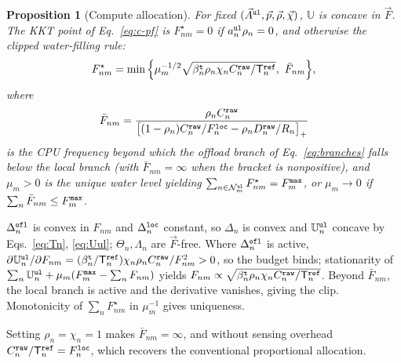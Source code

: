 \documentclass[journal]{IEEEtran}
\newtheorem{proposition}{Proposition}
\begin{document}
\begin{proposition}[Compute allocation]\label{prop:F}
For fixed $(\vec{A}^{\tt ul},\vec{p},\vec{\rho},\vec{\chi})$, $\mathbb{U}$ is concave in $\vec{F}$. The KKT point of Eq.~\eqref{eq:c-pf} is $F_{nm}^\star=0$ if $a_n^{\tt ul}\rho_n=0$, and otherwise the clipped water-filling rule:
\begin{equation}
F_{nm}^\star
=\min\Big\{\mu_m^{-1/2}\sqrt{\beta_n^{\tt t}\rho_n\chi_n C_n^{\tt raw}/\mathsf{T}_n^{\tt ref}},\ \bar F_{nm}\Big\},
\label{eq:Fstar}
\end{equation}
where
\begin{equation}
\bar F_{nm}
=\frac{\rho_n C_n^{\tt raw}}
{\big[(1-\rho_n)C_n^{\tt raw}/F_n^{\tt loc}-\rho_n D_n^{\tt raw}/R_n\big]_+}
\label{eq:Fbar}
\end{equation}
is the {CPU frequency} beyond which the offload branch of Eq.~\eqref{eq:branches} falls below the local branch (with $\bar F_{nm}=\infty$ when the bracket is nonpositive), and $\mu_m>0$ is the unique water level yielding $\sum_{n\in\mathcal{N}_m^{\tt ul}}F_{nm}^\star=F_m^{\tt max}$, or $\mu_m\to0$ if $\sum_n\bar F_{nm}\le F_m^{\tt max}$.
\end{proposition}
\begin{IEEEproof}
$\Delta_n^{\tt ofl}$ is convex in $F_{nm}$ and $\Delta_n^{\tt loc}$ constant, so $\Delta_n$ is convex and $\mathbb{U}_n^{\tt ul}$ concave by Eqs.~\eqref{eq:Tn}, \eqref{eq:Uul}; $\Theta_n,\Lambda_n$ are $\vec{F}$-free. Where $\Delta_n^{\tt ofl}$ is active, $\partial\mathbb{U}_n^{\tt ul}/\partial F_{nm}=(\beta_n^{\tt t}/\mathsf{T}_n^{\tt ref})\chi_n\rho_n C_n^{\tt raw}/F_{nm}^2>0$, so the budget binds; stationarity of $\sum_n\mathbb{U}_n^{\tt ul}+\mu_m(F_m^{\tt max}-\sum_n F_{nm})$ yields $F_{nm}\propto\sqrt{\beta_n^{\tt t}\rho_n\chi_n C_n^{\tt raw}/\mathsf{T}_n^{\tt ref}}$. Beyond $\bar F_{nm}$, the local branch is active and the derivative vanishes, giving the clip. Monotonicity of $\sum_n F_{nm}^\star$ in $\mu_m^{-1}$ gives uniqueness.
\end{IEEEproof}
Setting $\rho_n=\chi_n=1$ makes $\bar F_{nm}=\infty$, and without sensing overhead $C_n^{\tt raw}/\mathsf{T}_n^{\tt ref}=F_n^{\tt loc}$, which recovers the conventional proportional allocation.
\end{document}
